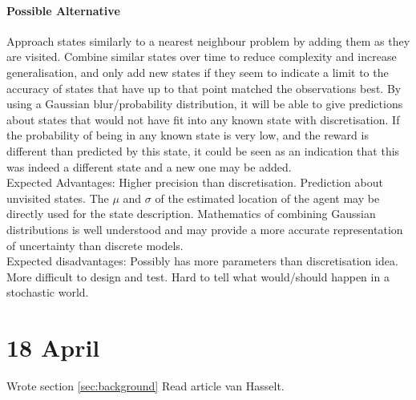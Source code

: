 \documentclass{article}
\begin{document}
	\paragraph{Possible Alternative}
	\label{par:possible_alternative}
	Approach states similarly to a nearest neighbour problem by adding them as
	they are visited. Combine similar states over time to reduce complexity and
	increase generalisation, and only add new states if they seem to indicate a
	limit to the accuracy of states that have up to that point matched the
	observations best.
	By using a Gaussian blur/probability distribution, it will be able to give
	predictions about states that would not have fit into any known state with
	discretisation. If the probability of being in any known state is very low,
	and the reward is different than predicted by this state, it could be seen
	as an indication that this was indeed a different state and a new one may be
	added.
	\\
	Expected Advantages: Higher precision than discretisation. Prediction about
	unvisited states. The $\mu$ and $\sigma$ of the estimated location of the
	agent may be directly used for the state description. Mathematics of
	combining Gaussian distributions is well understood and may provide a more
	accurate representation of uncertainty than discrete models.
	\\
	Expected disadvantages: Possibly has more parameters than discretisation
	idea. More difficult to design and test. Hard to tell what would/should
	happen in a stochastic world.

	\section{18 April}
	\label{sec:18_april}
	Wrote section \ref{sec:background}
	Read article van Hasselt.
\end{document}
